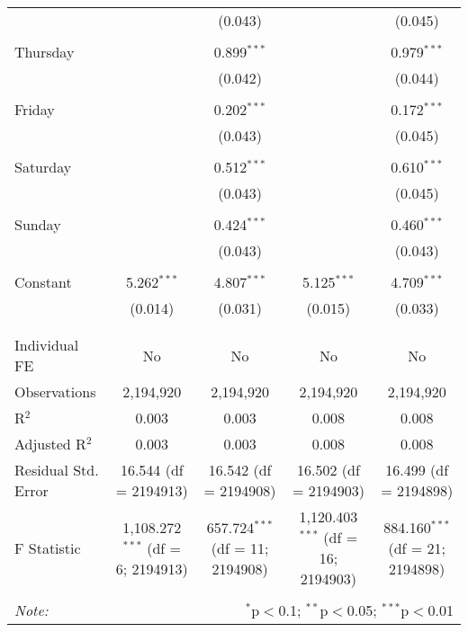 \documentclass[
]{article}
\begin{document}
\begin{table}[!htbp]
{\begin{tabular}{@{\extracolsep{5pt}}lcccc}
  &  & (0.043) &  & (0.045) \\ 
  & & & & \\ 
 Thursday &  & 0.899$^{***}$ &  & 0.979$^{***}$ \\ 
  &  & (0.042) &  & (0.044) \\ 
  & & & & \\ 
 Friday &  & 0.202$^{***}$ &  & 0.172$^{***}$ \\ 
  &  & (0.043) &  & (0.045) \\ 
  & & & & \\ 
 Saturday &  & 0.512$^{***}$ &  & 0.610$^{***}$ \\ 
  &  & (0.043) &  & (0.045) \\ 
  & & & & \\ 
 Sunday &  & 0.424$^{***}$ &  & 0.460$^{***}$ \\ 
  &  & (0.043) &  & (0.043) \\ 
  & & & & \\ 
 Constant & 5.262$^{***}$ & 4.807$^{***}$ & 5.125$^{***}$ & 4.709$^{***}$ \\ 
  & (0.014) & (0.031) & (0.015) & (0.033) \\ 
  & & & & \\ 
\hline \\[-1.8ex] 
Individual FE & No & No & No & No \\ 
Observations & 2,194,920 & 2,194,920 & 2,194,920 & 2,194,920 \\ 
R$^{2}$ & 0.003 & 0.003 & 0.008 & 0.008 \\ 
Adjusted R$^{2}$ & 0.003 & 0.003 & 0.008 & 0.008 \\ 
Residual Std. Error & 16.544 (df = 2194913) & 16.542 (df = 2194908) & 16.502 (df = 2194903) & 16.499 (df = 2194898) \\ 
F Statistic & 1,108.272$^{***}$ (df = 6; 2194913) & 657.724$^{***}$ (df = 11; 2194908) & 1,120.403$^{***}$ (df = 16; 2194903) & 884.160$^{***}$ (df = 21; 2194898) \\ 
\hline 
\hline \\[-1.8ex] 
\textit{Note:}  & \multicolumn{4}{r}{$^{*}$p$<$0.1; $^{**}$p$<$0.05; $^{***}$p$<$0.01} \\ 
\end{tabular}
} 
\end{table} 
\newpage
\end{document}
